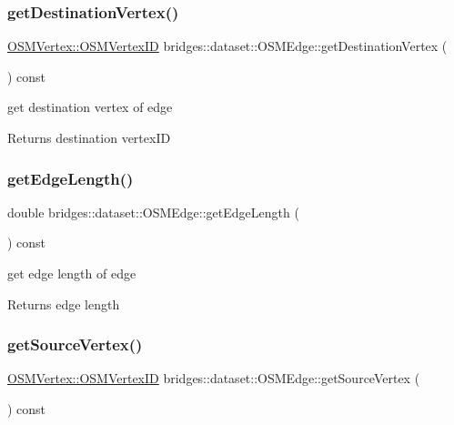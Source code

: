 \subsubsection{\texorpdfstring{get\+Destination\+Vertex()}{getDestinationVertex()}}
{\footnotesize\ttfamily \hyperlink{classbridges_1_1dataset_1_1_o_s_m_vertex_ad166f13b0aefbdc05a273546f2a3bb96}{O\+S\+M\+Vertex\+::\+O\+S\+M\+Vertex\+ID} bridges\+::dataset\+::\+O\+S\+M\+Edge\+::get\+Destination\+Vertex (\begin{DoxyParamCaption}{ }\end{DoxyParamCaption}) const\hspace{0.3cm}{\ttfamily [inline]}}

get destination vertex of edge

\begin{DoxyReturn}{Returns}
destination vertex\+ID 
\end{DoxyReturn}
\mbox{\label{classbridges_1_1dataset_1_1_o_s_m_edge_a4317cc9c09aa9a5108031185047cb399}} 
\subsubsection{\texorpdfstring{get\+Edge\+Length()}{getEdgeLength()}}
{\footnotesize\ttfamily double bridges\+::dataset\+::\+O\+S\+M\+Edge\+::get\+Edge\+Length (\begin{DoxyParamCaption}{ }\end{DoxyParamCaption}) const\hspace{0.3cm}{\ttfamily [inline]}}

get edge length of edge

\begin{DoxyReturn}{Returns}
edge length 
\end{DoxyReturn}
\mbox{\label{classbridges_1_1dataset_1_1_o_s_m_edge_abe843416c79a4765a7ecb52d02283310}} 
\subsubsection{\texorpdfstring{get\+Source\+Vertex()}{getSourceVertex()}}
{\footnotesize\ttfamily \hyperlink{classbridges_1_1dataset_1_1_o_s_m_vertex_ad166f13b0aefbdc05a273546f2a3bb96}{O\+S\+M\+Vertex\+::\+O\+S\+M\+Vertex\+ID} bridges\+::dataset\+::\+O\+S\+M\+Edge\+::get\+Source\+Vertex (\begin{DoxyParamCaption}{ }\end{DoxyParamCaption}) const\hspace{0.3cm}{\ttfamily [inline]}}

